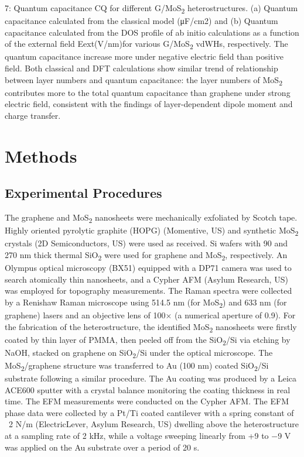  7: Quantum capacitance CQ for different G/MoS\textsubscript{2} heterostructures. (a) Quantum capacitance calculated from the classical model    (μF/cm2)  and (b) Quantum capacitance calculated from the DOS profile of ab initio  calculations   as a function of the external field Eext(V/nm)for various G/MoS\textsubscript{2} vdWHs, respectively. The quantum capacitance increase more under negative electric field than positive field. Both classical and DFT calculations show similar trend of relationship between layer numbers and quantum capacitance: the layer numbers of MoS\textsubscript{2} contributes more to the total quantum capacitance than graphene under strong electric field, consistent with the findings of layer-dependent dipole moment and charge transfer. 

\section{Methods}
\label{sec:asym-methods}

\subsection{Experimental Procedures}
\label{sec:asym-exper-proc}

The graphene and MoS\textsubscript{2} nanosheets were mechanically exfoliated by Scotch tape. Highly oriented pyrolytic graphite (HOPG) (Momentive, US) and synthetic MoS\textsubscript{2} crystals (2D Semiconductors, US) were used as received. Si wafers with 90 and 270 nm thick thermal SiO\textsubscript{2} were used for graphene and MoS\textsubscript{2}, respectively. An Olympus optical microscopy (BX51) equipped with a DP71 camera was used to search atomically thin nanosheets, and a Cypher AFM (Asylum Research, US) was employed for topography measurements. The Raman spectra were collected by a Renishaw Raman microscope using 514.5 nm (for MoS\textsubscript{2}) and 633 nm (for graphene) lasers and an objective lens of 100× (a numerical aperture of 0.9). For the fabrication of the heterostructure, the identified MoS\textsubscript{2} nanosheets were firstly coated by thin layer of PMMA, then peeled off from the SiO\textsubscript{2}/Si via etching by NaOH, stacked on graphene on SiO\textsubscript{2}/Si under the optical microscope. The MoS\textsubscript{2}/graphene structure was transferred to Au (100 nm) coated SiO\textsubscript{2}/Si substrate following a similar procedure. The Au coating was produced by a Leica ACE600 sputter with a crystal balance monitoring the coating thickness in real time. The EFM measurements were conducted on the Cypher AFM. The EFM phase data were collected by a Pt/Ti coated cantilever with a spring constant of ~2 N/m (ElectricLever, Asylum Research, US) dwelling above the heterostructure at a sampling rate of 2 kHz, while a voltage sweeping linearly from +9 to −9 V was applied on the Au substrate over a period of 20 s.

